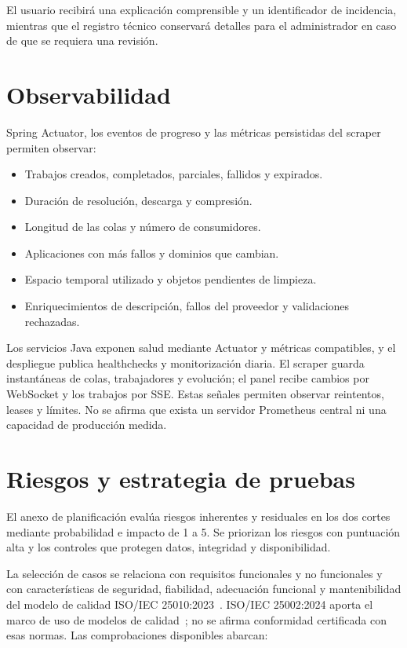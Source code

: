 El usuario recibirá una explicación comprensible y un identificador de incidencia, mientras que el registro técnico conservará detalles para el administrador en caso de que se requiera una revisión.

\section{Observabilidad}

Spring Actuator, los eventos de progreso y las métricas persistidas del scraper permiten observar:

\begin{itemize}
	\item Trabajos creados, completados, parciales, fallidos y expirados.
	\item Duración de resolución, descarga y compresión.
	\item Longitud de las colas y número de consumidores.
	\item Aplicaciones con más fallos y dominios que cambian.
	\item Espacio temporal utilizado y objetos pendientes de limpieza.
	\item Enriquecimientos de descripción, fallos del proveedor y validaciones rechazadas.
\end{itemize}

Los servicios Java exponen salud mediante Actuator y métricas compatibles, y el despliegue publica healthchecks y monitorización diaria. El scraper guarda instantáneas de colas, trabajadores y evolución; el panel recibe cambios por WebSocket y los trabajos por SSE. Estas señales permiten observar reintentos, leases y límites. No se afirma que exista un servidor Prometheus central ni una capacidad de producción medida.

\section{Riesgos y estrategia de pruebas}

El anexo de planificación evalúa riesgos inherentes y residuales en los dos cortes mediante probabilidad e impacto de 1 a 5. Se priorizan los riesgos con puntuación alta y los controles que protegen datos, integridad y disponibilidad.

La selección de casos se relaciona con requisitos funcionales y no funcionales y con características de seguridad, fiabilidad, adecuación funcional y mantenibilidad del modelo de calidad ISO/IEC 25010:2023~\cite{iso25010}. ISO/IEC 25002:2024 aporta el marco de uso de modelos de calidad~\cite{iso25002}; no se afirma conformidad certificada con esas normas. Las comprobaciones disponibles abarcan:

